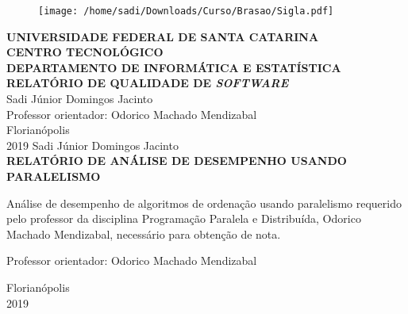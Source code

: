 \documentclass[12pt,a4paper,brazil,abntex2]{article}
\begin{document}
\singlespacing
\begin{titlepage}
\begin{center}
\begin{figure}[!htb]
\center

\texttt{[image: /home/sadi/Downloads/Curso/Brasao/Sigla.pdf]} 

\end{figure}
{\bf  UNIVERSIDADE FEDERAL DE SANTA CATARINA}\\[0.2cm]
{\bf CENTRO TECNOLÓGICO}\\[0.2cm]
{\bf  DEPARTAMENTO DE INFORMÁTICA E ESTATÍSTICA}\\[5.5cm]
{\bf \large RELATÓRIO DE QUALIDADE DE \textit{SOFTWARE}}\\[3.6 cm]
{Sadi Júnior Domingos Jacinto}\\[1cm]
{Professor orientador: Odorico Machado Mendizabal}\\[4.1 cm]
{Florianópolis}\\[0.2cm]
{2019}
\newpage
\thispagestyle{empty}
{Sadi Júnior Domingos Jacinto}\\[9cm]
{\bf \large RELATÓRIO DE ANÁLISE DE DESEMPENHO USANDO PARALELISMO}\\[0.5cm]
    \begin{flushright}
    \begin{list}{}{
      \setlength{\leftmargin}{7.2cm}
      \setlength{\rightmargin}{0cm}
      \setlength{\labelwidth}{0pt}
      \setlength{\labelsep}{\leftmargin}}
      \item Análise de desempenho de algoritmos de ordenação usando paralelismo requerido pelo professor da disciplina Programação Paralela e Distribuída, Odorico Machado Mendizabal, necessário para obtenção de nota.\\[0.2 cm] 
      \setlength{\labelsep}{\leftmargin}
      \item Professor orientador: Odorico Machado Mendizabal\
      \\[8.2cm]
     \end{list}
	 \end{flushright}
{Florianópolis}\\[0.2cm]
{2019}
\end{center}
\end{titlepage} %

\newpage
\thispagestyle{empty}
\begin{center}
\tableofcontents
\end{center}
	




\end{document}
